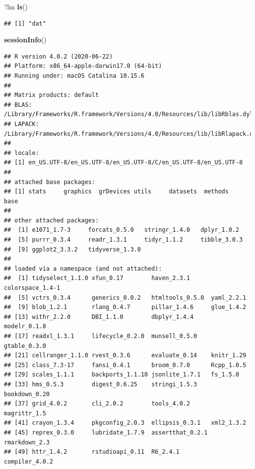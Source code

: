 \documentclass[
]{book}
\newenvironment{Shaded}{\begin{snugshade}}{\end{snugshade}}
\newcommand{\KeywordTok}[1]{\textcolor[rgb]{0.13,0.29,0.53}{\textbf{#1}}}
\newcommand{\NormalTok}[1]{#1}
\begin{document}
\begin{Shaded}
\begin{Highlighting}[]
\NormalTok{?lm}
\KeywordTok{ls}\NormalTok{()}
\end{Highlighting}
\end{Shaded}

\begin{verbatim}
## [1] "dat"
\end{verbatim}

\begin{Shaded}
\begin{Highlighting}[]
\KeywordTok{sessionInfo}\NormalTok{()}
\end{Highlighting}
\end{Shaded}

\begin{verbatim}
## R version 4.0.2 (2020-06-22)
## Platform: x86_64-apple-darwin17.0 (64-bit)
## Running under: macOS Catalina 10.15.6
## 
## Matrix products: default
## BLAS:   /Library/Frameworks/R.framework/Versions/4.0/Resources/lib/libRblas.dylib
## LAPACK: /Library/Frameworks/R.framework/Versions/4.0/Resources/lib/libRlapack.dylib
## 
## locale:
## [1] en_US.UTF-8/en_US.UTF-8/en_US.UTF-8/C/en_US.UTF-8/en_US.UTF-8
## 
## attached base packages:
## [1] stats     graphics  grDevices utils     datasets  methods   base     
## 
## other attached packages:
##  [1] e1071_1.7-3     forcats_0.5.0   stringr_1.4.0   dplyr_1.0.2    
##  [5] purrr_0.3.4     readr_1.3.1     tidyr_1.1.2     tibble_3.0.3   
##  [9] ggplot2_3.3.2   tidyverse_1.3.0
## 
## loaded via a namespace (and not attached):
##  [1] tidyselect_1.1.0 xfun_0.17        haven_2.3.1      colorspace_1.4-1
##  [5] vctrs_0.3.4      generics_0.0.2   htmltools_0.5.0  yaml_2.2.1      
##  [9] blob_1.2.1       rlang_0.4.7      pillar_1.4.6     glue_1.4.2      
## [13] withr_2.2.0      DBI_1.1.0        dbplyr_1.4.4     modelr_0.1.8    
## [17] readxl_1.3.1     lifecycle_0.2.0  munsell_0.5.0    gtable_0.3.0    
## [21] cellranger_1.1.0 rvest_0.3.6      evaluate_0.14    knitr_1.29      
## [25] class_7.3-17     fansi_0.4.1      broom_0.7.0      Rcpp_1.0.5      
## [29] scales_1.1.1     backports_1.1.10 jsonlite_1.7.1   fs_1.5.0        
## [33] hms_0.5.3        digest_0.6.25    stringi_1.5.3    bookdown_0.20   
## [37] grid_4.0.2       cli_2.0.2        tools_4.0.2      magrittr_1.5    
## [41] crayon_1.3.4     pkgconfig_2.0.3  ellipsis_0.3.1   xml2_1.3.2      
## [45] reprex_0.3.0     lubridate_1.7.9  assertthat_0.2.1 rmarkdown_2.3   
## [49] httr_1.4.2       rstudioapi_0.11  R6_2.4.1         compiler_4.0.2
\end{verbatim}
\end{document}

